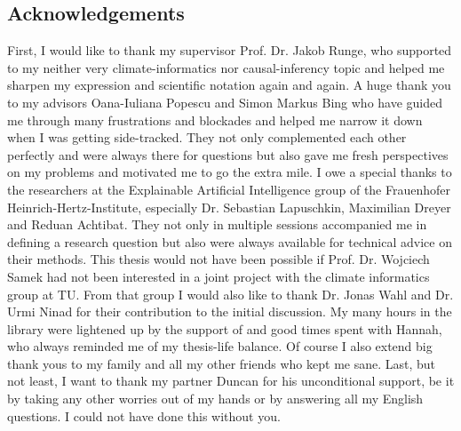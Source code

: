 \subsection*{Acknowledgements}

First, I would like to thank my supervisor Prof. Dr. Jakob Runge, who supported to my neither very climate-informatics nor causal-inferency topic and helped me sharpen my expression and scientific notation again and again.
A huge thank you to my advisors Oana-Iuliana Popescu and Simon Markus Bing who have guided me through many frustrations and blockades and helped me narrow it down when I was getting side-tracked. 
They not only complemented each other perfectly and were always there for questions but also gave me fresh perspectives on my problems and motivated me to go the extra mile.
I owe a special thanks to the researchers at the Explainable Artificial Intelligence group of the Frauenhofer Heinrich-Hertz-Institute, especially Dr. Sebastian Lapuschkin, Maximilian Dreyer and Reduan Achtibat. They not only in multiple sessions accompanied me in defining a research question but also were always available for technical advice on their methods. This thesis would not have been possible if Prof. Dr. Wojciech Samek had not been interested in a joint project with the climate informatics group at TU. From that group I would also like to thank Dr. Jonas Wahl and Dr. Urmi Ninad for their contribution to the initial discussion. 
My many hours in the library were lightened up by the support of and good times spent with Hannah, who always reminded me of my thesis-life balance. Of course I also extend big thank yous to my family and all my other friends who kept me sane. 
Last, but not least, I want to thank my partner Duncan for his unconditional support, be it by taking any other worries out of my hands or by answering all my English questions. 
I could not have done this without you.
